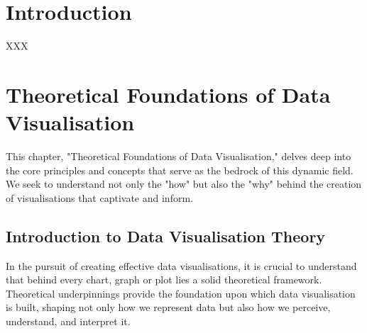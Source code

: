 \documentclass{article}\usepackage[]{graphicx}\usepackage[]{xcolor}
\makeatletter
\newenvironment{kframe}{%
 \def\at@end@of@kframe{}%
 \ifinner\ifhmode%
  \def\at@end@of@kframe{\end{minipage}}%
  \begin{minipage}{\columnwidth}%
 \fi\fi%
 \def\FrameCommand##1{\hskip\@totalleftmargin \hskip-\fboxsep
 \colorbox{shadecolor}{##1}\hskip-\fboxsep
     \hskip-\linewidth \hskip-\@totalleftmargin \hskip\columnwidth}%
 \MakeFramed {\advance\hsize-\width
   \@totalleftmargin\z@ \linewidth\hsize
   \@setminipage}}%
 {\par\unskip\endMakeFramed%
 \at@end@of@kframe}
\newenvironment{knitrout}{}{} %
\makeatother
\begin{document}
\begin{knitrout}
\color{fgcolor}\begin{kframe}


{\ttfamily\noindent\bfseries\color{errorcolor}{\#\# Error in library(forecast): there is no package called 'forecast'}}

{\ttfamily\noindent\bfseries\color{errorcolor}{\#\# Error in library(sf): there is no package called 'sf'}}

{\ttfamily\noindent\bfseries\color{errorcolor}{\#\# Error in library(tmap): there is no package called 'tmap'}}

{\ttfamily\noindent\bfseries\color{errorcolor}{\#\# Error in library(igraph): there is no package called 'igraph'}}

{\ttfamily\noindent\bfseries\color{errorcolor}{\#\# Error in library(scatterplot3d): there is no package called 'scatterplot3d'}}\end{kframe}
\end{knitrout}

\tableofcontents
\newpage 

\section{Introduction}
XXX
\newpage 


\section{Theoretical Foundations of Data Visualisation}
This chapter, "Theoretical Foundations of Data Visualisation," delves deep into the core principles and concepts that serve as the bedrock of this dynamic field. We seek to understand not only the "how" but also the "why" behind the creation of visualisations that captivate and inform.

\subsection{Introduction to Data Visualisation Theory}
In the pursuit of creating effective data visualisations, it is crucial to understand that behind every chart, graph or plot lies a solid theoretical framework. Theoretical underpinnings provide the foundation upon which data visualisation is built, shaping not only how we represent data but also how we perceive, understand, and interpret it. 
\end{document}

